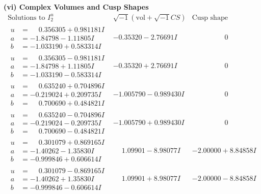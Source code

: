 \documentclass[1p]{elsarticle_modified}
\theoremstyle{definition}
\newcommand{\I}{\sqrt{-1}}
\begin{document}
\newpage\flushleft \textbf{(vi) Complex Volumes and Cusp Shapes}
$$\begin{array}{c|c|c}  
\text{Solutions to }I^u_{2}& \I (\text{vol} + \sqrt{-1}CS) & \text{Cusp shape}\\
 \hline 
\begin{aligned}
u &= \phantom{-}0.356305 + 0.981181 I \\
a &= -1.84798 - 1.11805 I \\
b &= -1.033190 + 0.583314 I\end{aligned}
 & -0.35320 - 2.76691 I & \phantom{-0.000000 } 0 \\ \hline\begin{aligned}
u &= \phantom{-}0.356305 - 0.981181 I \\
a &= -1.84798 + 1.11805 I \\
b &= -1.033190 - 0.583314 I\end{aligned}
 & -0.35320 + 2.76691 I & \phantom{-0.000000 } 0 \\ \hline\begin{aligned}
u &= \phantom{-}0.635240 + 0.704896 I \\
a &= -0.219024 + 0.209735 I \\
b &= \phantom{-}0.700690 + 0.484821 I\end{aligned}
 & -1.005790 - 0.989430 I & \phantom{-0.000000 } 0 \\ \hline\begin{aligned}
u &= \phantom{-}0.635240 - 0.704896 I \\
a &= -0.219024 - 0.209735 I \\
b &= \phantom{-}0.700690 - 0.484821 I\end{aligned}
 & -1.005790 + 0.989430 I & \phantom{-0.000000 } 0 \\ \hline\begin{aligned}
u &= \phantom{-}0.301079 + 0.869165 I \\
a &= -1.40262 - 1.35830 I \\
b &= -0.999846 + 0.606614 I\end{aligned}
 & \phantom{-}1.09901 - 8.98077 I & -2.00000 + 8.84858 I \\ \hline\begin{aligned}
u &= \phantom{-}0.301079 - 0.869165 I \\
a &= -1.40262 + 1.35830 I \\
b &= -0.999846 - 0.606614 I\end{aligned}
 & \phantom{-}1.09901 + 8.98077 I & -2.00000 - 8.84858 I \\ \hline\begin{aligned}

\end{aligned}
\end{array}$$
\end{document}
